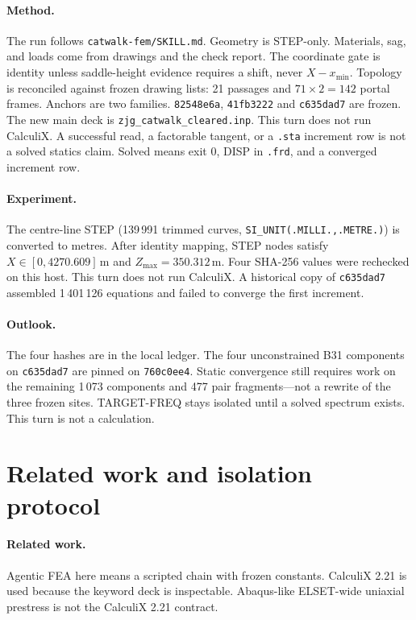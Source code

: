\documentclass[11pt,a4paper]{article}
\begin{document}
\paragraph{Method.}
The run follows \texttt{catwalk-fem/SKILL.md}. Geometry is STEP-only.
Materials, sag, and loads come from drawings and the check report. The
coordinate gate is identity unless saddle-height evidence requires a shift,
never \(X-x_{\min}\). Topology is reconciled against frozen drawing lists:
21 passages and \(71\times 2=142\) portal frames. Anchors are two families.
\texttt{82548e6a}, \texttt{41fb3222} and \texttt{c635dad7} are frozen.
The new main deck is \texttt{zjg\_catwalk\_cleared.inp}. This turn does not
run CalculiX.
A successful read, a factorable tangent, or a \texttt{.sta} increment row is
not a solved statics claim. Solved means exit 0, DISP in \texttt{.frd}, and
a converged increment row.

\paragraph{Experiment.}
The centre-line STEP (139\,991 trimmed curves,
\texttt{SI\_UNIT(.MILLI.,.METRE.)}) is converted to metres. After identity
mapping, STEP nodes satisfy \(X\in[0,4270.609]\)\,m and
\(Z_{\max}=350.312\)\,m. Four SHA-256 values were rechecked on this host.
This turn does not run CalculiX. A historical copy of \texttt{c635dad7}
assembled 1\,401\,126 equations and failed to converge the first increment.

\paragraph{Outlook.}
The four hashes are in the local ledger. The four unconstrained B31
components on \texttt{c635dad7} are pinned on \texttt{760c0ee4}. Static
convergence still requires work on the remaining 1\,073 components and 477
pair fragments---not a rewrite of the three frozen sites. TARGET-FREQ stays
isolated until a solved spectrum exists. This turn is not a calculation.

\section{Related work and isolation protocol}
\label{sec:iso}

\paragraph{Related work.}
Agentic FEA here means a scripted chain with frozen constants. CalculiX 2.21
is used because the keyword deck is inspectable. Abaqus-like ELSET-wide
uniaxial prestress is not the CalculiX 2.21 contract.
\end{document}
